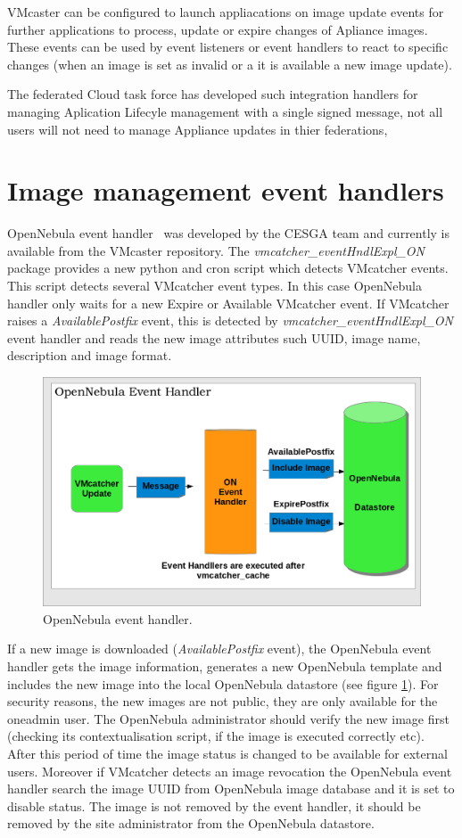 \documentclass{llncs_Ibergrid2013}
\begin{document}
VMcaster can be configured to launch appliacations on image update events for further applications to process, update or expire changes of Apliance images.  These events can be used by event listeners or event handlers to react to specific changes (when an image is set as invalid or a it is available a new image update). 

The federated Cloud task force has developed such integration handlers for managing Aplication Lifecyle management with a single signed message, not all users will not need to manage Appliance updates in thier federations,

\section{Image management event handlers}
\label{sect-handlers}
OpenNebula event handler~\cite{onevent} was developed by the CESGA team and currently is available from the VMcaster repository. 
The \textit{vmcatcher\_eventHndlExpl\_ON} package provides a new python and cron script which detects VMcatcher events. 
This script detects several VMcatcher event types. In this case OpenNebula handler only waits for a new Expire or Available VMcatcher event.
If VMcatcher raises a \textit{AvailablePostfix} event, this is detected by \textit{vmcatcher\_eventHndlExpl\_ON} event handler and reads the new image attributes such UUID, image name, description and image format.
\begin{figure}[h]
\centering
\includegraphics[width=1\textwidth]{ONeventhandler.png}
\caption{OpenNebula event handler.}
\label{fig:onevent}
\end{figure}
If a new image is downloaded (\textit{AvailablePostfix} event), the OpenNebula event handler gets the image information, generates a new OpenNebula template and includes the new image into the local OpenNebula datastore (see figure \ref{fig:onevent}). 
For security reasons, the new images are not public, they are only available for the oneadmin user. The OpenNebula administrator should verify the new image first (checking its contextualisation script, if the image is executed correctly etc).
After this period of time the image status is changed to be available for external users. 
Moreover if VMcatcher detects an image revocation the OpenNebula event handler search the image UUID from OpenNebula image database and it is set to disable status.
The image is not removed by the event handler, it should be removed by the site administrator from the OpenNebula datastore.
\end{document}
